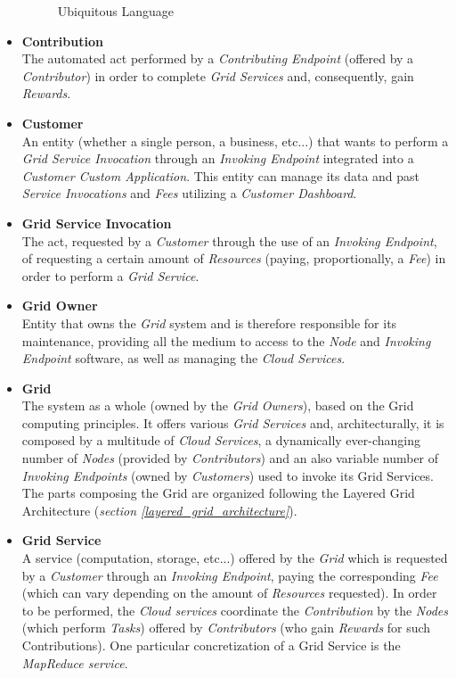 \begin{itemize}
\begin{figure}[!ht]
        \caption{Ubiquitous Language}
        \label{fig:ul}
    \end{figure}
    \item \textbf{Contribution}\label{contribution}\\
    The automated act performed by a \textit{Contributing Endpoint} (offered by a \textit{Contributor}) in order to complete \textit{Grid Services} and, consequently, gain \textit{Rewards}.
    \vspace{5mm}
    \item \textbf{Customer}\label{customer}\\
    An entity (whether a single person, a business, etc...) that wants to perform a \textit{Grid Service Invocation} through an \textit{Invoking Endpoint} integrated into a \textit{Customer Custom Application}. This entity can manage its data and past \textit{Service Invocations} and \textit{Fees} utilizing a \textit{Customer Dashboard}.
    \item \textbf{Grid Service Invocation}\label{grid_service_invocation}\\
    The act, requested by a \textit{Customer} through the use of an \textit{Invoking Endpoint}, of requesting a certain amount of \textit{Resources} (paying, proportionally, a \textit{Fee}) in order to perform a \textit{Grid Service}.
    \item \textbf{Grid Owner}\label{grid_owner}\\
    Entity that owns the \textit{Grid} system and is therefore responsible for its maintenance, providing all the medium to access to the \textit{Node} and \textit{Invoking Endpoint} software, as well as managing the \textit{Cloud Services}.
    \item \textbf{Grid}\label{grid}\\
    The system as a whole (owned by the \textit{Grid Owners}), based on the Grid computing principles. It offers various \textit{Grid Services} and, architecturally, it is composed by a multitude of \textit{Cloud Services}, a dynamically ever-changing number of \textit{Nodes} (provided by \textit{Contributors}) and an also variable number of \textit{Invoking Endpoints} (owned by \textit{Customers}) used to invoke its Grid Services. The parts composing the Grid are organized following the Layered Grid Architecture (\textit{section \ref{layered_grid_architecture}}).
    \item \textbf{Grid Service}\label{grid_service}\\
    A service (computation, storage, etc...) offered by the \textit{Grid} which is requested by a \textit{Customer} through an \textit{Invoking Endpoint}, paying the corresponding \textit{Fee} (which can vary depending on the amount of \textit{Resources} requested). In order to be performed, the \textit{Cloud services} coordinate the \textit{Contribution} by the \textit{Nodes} (which perform \textit{Tasks}) offered by \textit{Contributors} (who gain \textit{Rewards} for such Contributions). One particular concretization of a Grid Service is the \textit{MapReduce service}.

\end{itemize}
